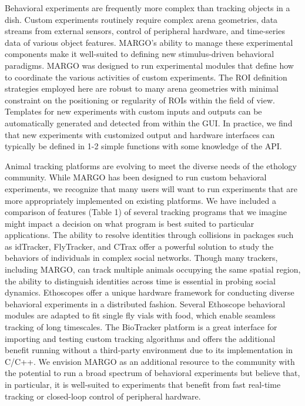 \documentclass[10pt]{article}
\begin{document}
\begin{multicols}{2}
Behavioral experiments are frequently more complex than tracking objects in a dish. Custom experiments routinely require complex arena geometries, data streams from external sensors, control of peripheral hardware, and time-series data of various object features. MARGO's ability to manage these experimental components make it well-suited to defining new stimulus-driven behavioral paradigms. MARGO was designed to run experimental modules that define how to coordinate the various activities of custom experiments. The ROI definition strategies employed here are robust to many arena geometries with minimal constraint on the positioning or regularity of ROIs within the field of view. Templates for new experiments with custom inputs and outputs can be automatically generated and detected from within the GUI. In practice, we find that new experiments with customized output and hardware interfaces can typically be defined in 1-2 simple functions with some knowledge of the API.

Animal tracking platforms are evolving to meet the diverse needs of the ethology community. While MARGO has been designed to run custom behavioral experiments, we recognize that many users will want to run experiments that are more appropriately implemented on existing platforms. We have included a comparison of features (Table 1) of several tracking programs that we imagine might impact a decision on what program is best suited to particular applications. The ability to resolve identities through collisions in packages such as idTracker, FlyTracker, and CTrax offer a powerful solution to study the behaviors of individuals in complex social networks. Though many trackers, including MARGO, can track multiple animals occupying the same spatial region, the ability to distinguish identities across time is essential in probing social dynamics. Ethoscopes offer a unique hardware framework for conducting diverse behavioral experiments in a distributed fashion. Several Ethoscope behavioral modules are adapted to fit single fly vials with food, which enable seamless tracking of long timescales. The BioTracker platform is a great interface for importing and testing custom tracking algorithms and offers the additional benefit running without a third-party environment due to its implementation in C/C++.  We envision MARGO as an additional resource to the community with the potential to run a broad spectrum of behavioral experiments but believe that, in particular, it is well-suited to experiments that benefit from fast real-time tracking or closed-loop control of peripheral hardware. 


\end{multicols}
\end{document}
